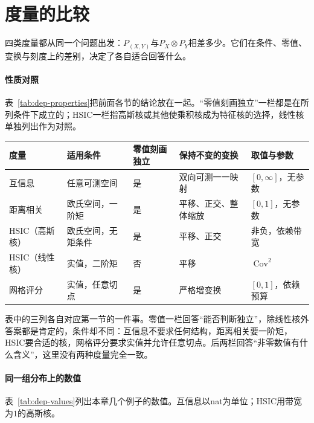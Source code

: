 \section{度量的比较}
\label{sec:dep-comparison}

四类度量都从同一个问题出发：$P_{(X,Y)}$与$P_X\otimes P_Y$相差多少。它们在条件、零值、变换与刻度上的差别，决定了各自适合回答什么。

\paragraph{性质对照}
表~\ref{tab:dep-properties}把前面各节的结论放在一起。“零值刻画独立”一栏都是在所列条件下成立的；HSIC一栏指高斯核或其他使乘积核成为特征核的选择，线性核单独列出作为对照。

\begin{BookInlineTable}
  \centering
  \small
  \begin{tabular}{@{}p{15mm}p{22mm}p{13mm}p{26mm}p{20mm}@{}}
    \toprule
    度量 & 适用条件 & 零值刻画独立 & 保持不变的变换 & 取值与参数\\
    \midrule
    互信息 & 任意可测空间 & 是 & 双向可测一一映射 & $[0,\infty]$，无参数\\
    距离相关 & 欧氏空间，一阶矩 & 是 & 平移、正交、整体缩放 & $[0,1]$，无参数\\
    HSIC（高斯核） & 欧氏空间，无矩条件 & 是 & 平移、正交 & 非负，依赖带宽\\
    HSIC（线性核） & 实值，二阶矩 & 否 & 平移 & $\operatorname{Cov}^{2}$\\
    网格评分 & 实值，任意切点 & 是 & 严格增变换 & $[0,1]$，依赖预算\\
    \bottomrule
  \end{tabular}
  \caption{依赖度量的性质对照。“保持不变的变换”指对两个变量分别作该类变换时度量不变；HSIC在整体缩放下数值改变，除非带宽随之缩放。网格评分只依赖切点两侧的概率，严格增变换只移动切点，不改变可达到的概率表。}
  \label{tab:dep-properties}
\end{BookInlineTable}

表中的三列各自对应第一节的一件事。零值一栏回答“能否判断独立”，除线性核外答案都是肯定的，条件却不同：互信息不要求任何结构，距离相关要一阶矩，HSIC要合适的核，网格评分要求实值并允许任意切点。后两栏回答“非零数值有什么含义”，这里没有两种度量完全一致。

\paragraph{同一组分布上的数值}
表~\ref{tab:dep-values}列出本章几个例子的数值。互信息以nat为单位；HSIC用带宽为$1$的高斯核。

